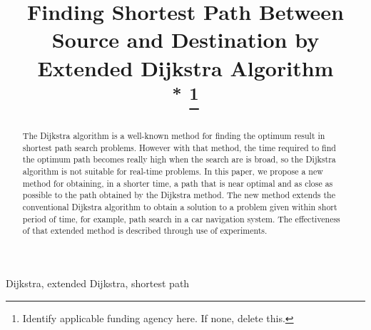 \documentclass[conference]{IEEEtran}
\begin{document}
\title{Finding Shortest Path Between Source and Destination by
Extended Dijkstra Algorithm\\
{\footnotesize \textsuperscript{*}}
\thanks{Identify applicable funding agency here. If none, delete this.}
}


\author{
\and
{}
\and
{}

}

\maketitle

\begin{abstract}
The Dijkstra algorithm is a well-known method for
finding the optimum result in shortest path search
problems. However with that method, the time required to find the optimum path becomes really high when the search are is broad, so the Dijkstra
algorithm is not suitable for real-time problems. In this
paper, we propose a new method for obtaining, in a shorter
time, a path that is near optimal and as close as possible to the path
obtained by the Dijkstra method.
The new method extends the conventional Dijkstra
algorithm to obtain a solution to a problem given
within short period of time, for example, path search in a car
navigation system. The effectiveness of that extended
method is described through use of experiments. 
\end{abstract}

\begin{IEEEkeywords}
Dijkstra, extended Dijkstra, shortest path
\end{IEEEkeywords}
\end{document}
